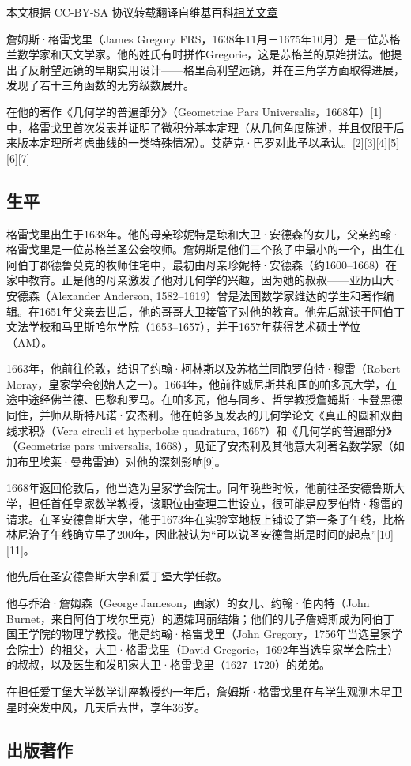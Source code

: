 
本文根据 CC-BY-SA 协议转载翻译自维基百科\href{https://en.wikipedia.org/wiki/James_Gregory_(mathematician)}{相关文章}

詹姆斯·格雷戈里（James Gregory FRS，1638年11月－1675年10月）是一位苏格兰数学家和天文学家。他的姓氏有时拼作Gregorie，这是苏格兰的原始拼法。他提出了反射望远镜的早期实用设计——格里高利望远镜，并在三角学方面取得进展，发现了若干三角函数的无穷级数展开。

在他的著作《几何学的普遍部分》（Geometriae Pars Universalis，1668年）[1] 中，格雷戈里首次发表并证明了微积分基本定理（从几何角度陈述，并且仅限于后来版本定理所考虑曲线的一类特殊情况）。艾萨克·巴罗对此予以承认。[2][3][4][5][6][7]
\subsection{生平}
格雷戈里出生于1638年。他的母亲珍妮特是琼和大卫·安德森的女儿，父亲约翰·格雷戈里是一位苏格兰圣公会牧师。詹姆斯是他们三个孩子中最小的一个，出生在阿伯丁郡德鲁莫克的牧师住宅中，最初由母亲珍妮特·安德森（约1600–1668）在家中教育。正是他的母亲激发了他对几何学的兴趣，因为她的叔叔——亚历山大·安德森（Alexander Anderson, 1582–1619）曾是法国数学家维达的学生和著作编辑。在1651年父亲去世后，他的哥哥大卫接管了对他的教育。他先后就读于阿伯丁文法学校和马里斯哈尔学院（1653–1657），并于1657年获得艺术硕士学位（AM）。

1663年，他前往伦敦，结识了约翰·柯林斯以及苏格兰同胞罗伯特·穆雷（Robert Moray，皇家学会创始人之一）。1664年，他前往威尼斯共和国的帕多瓦大学，在途中途经佛兰德、巴黎和罗马。在帕多瓦，他与同乡、哲学教授詹姆斯·卡登黑德同住，并师从斯特凡诺·安杰利。他在帕多瓦发表的几何学论文《真正的圆和双曲线求积》（Vera circuli et hyperbolæ quadratura, 1667）和《几何学的普遍部分》（Geometriæ pars universalis, 1668），见证了安杰利及其他意大利著名数学家（如加布里埃莱·曼弗雷迪）对他的深刻影响[9]。

1668年返回伦敦后，他当选为皇家学会院士。同年晚些时候，他前往圣安德鲁斯大学，担任首任皇家数学教授，该职位由查理二世设立，很可能是应罗伯特·穆雷的请求。在圣安德鲁斯大学，他于1673年在实验室地板上铺设了第一条子午线，比格林尼治子午线确立早了200年，因此被认为“可以说圣安德鲁斯是时间的起点”[10][11]。

他先后在圣安德鲁斯大学和爱丁堡大学任教。

他与乔治·詹姆森（George Jameson，画家）的女儿、约翰·伯内特（John Burnet，来自阿伯丁埃尔里克）的遗孀玛丽结婚；他们的儿子詹姆斯成为阿伯丁国王学院的物理学教授。他是约翰·格雷戈里（John Gregory，1756年当选皇家学会院士）的祖父，大卫·格雷戈里（David Gregorie，1692年当选皇家学会院士）的叔叔，以及医生和发明家大卫·格雷戈里（1627–1720）的弟弟。

在担任爱丁堡大学数学讲座教授约一年后，詹姆斯·格雷戈里在与学生观测木星卫星时突发中风，几天后去世，享年36岁。
\subsection{出版著作}